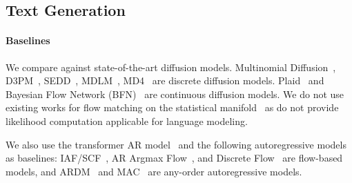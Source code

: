 

\subsection{Text Generation} \label{app:exp:text}

\paragraph{Baselines}
We compare against state-of-the-art diffusion models. 
Multinomial Diffusion~\citep{hoogeboom2021multinomial}, D3PM~\citep{austin2021d3pm}, SEDD~\citep{lou2024sedd}, MDLM~\citep{sahoo2024simple}, MD4~\citep{shi2024md4} are discrete diffusion models. Plaid~\citep{gulrajani2024plaid} and Bayesian Flow Network (BFN)~\citep{graves2023bayesian} are continuous diffusion models. 
We do not use existing works for flow matching on the statistical manifold~\citep{cheng2024categorical,davis2024fisherflow} as do not provide likelihood computation applicable for language modeling.

We also use the transformer AR model~\citep{vaswani2017transformer} and the following autoregressive models as baselines:
IAF/SCF~\citep{ziegler2019iaf}, AR Argmax Flow~\citep{hoogeboom2021multinomial}, and Discrete Flow~\citep{tran2019discrete} are flow-based models, and ARDM~\citep{hoogeboom2022autoregressive} and MAC~\citep{shih2022ardm} are any-order autoregressive models. 





